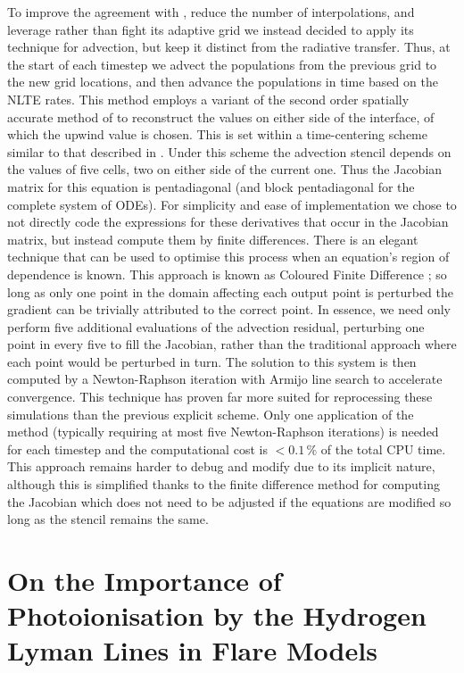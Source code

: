 To improve the agreement with \Radyn{}, reduce the number of interpolations, and leverage rather than fight its adaptive grid we instead decided to apply its technique for advection, but keep it distinct from the radiative transfer.
Thus, at the start of each timestep we advect the populations from the previous grid to the new grid locations, and then advance the populations in time based on the NLTE rates.
This method employs a variant of the second order spatially accurate method of \citet{VanLeer1979} to reconstruct the values on either side of the interface, of which the upwind value is chosen.
This is set within a time-centering scheme similar to that described in \citet{Dorfi1997}.
Under this scheme the advection stencil depends on the values of five cells, two on either side of the current one.
Thus the Jacobian matrix for this equation is pentadiagonal (and block pentadiagonal for the complete system of ODEs).
For simplicity and ease of implementation we chose to not directly code the expressions for these derivatives that occur in the Jacobian matrix, but instead compute them by finite differences.
There is an elegant technique that can be used to optimise this process when an equation's region of dependence is known.
This approach is known as Coloured Finite Difference \citep{Curtis1974}; so long as only one point in the domain affecting each output point is perturbed the gradient can be trivially attributed to the correct point.
In essence, we need only perform five additional evaluations of the advection residual, perturbing one point in every five to fill the Jacobian, rather than the traditional approach where each point would be perturbed in turn.
The solution to this system is then computed by a Newton-Raphson iteration with Armijo line search \NeedRef{} to accelerate convergence.
This technique has proven far more suited for reprocessing these simulations than the previous explicit scheme.
Only one application of the method (typically requiring at most five Newton-Raphson iterations) is needed for each timestep and the computational cost is $<0.1\,\%$ of the total CPU time.
This approach remains harder to debug and modify due to its implicit nature, although this is simplified thanks to the finite difference method for computing the Jacobian which does not need to be adjusted if the equations are modified so long as the stencil remains the same.

\section{On the Importance of \Caii{} Photoionisation by the Hydrogen Lyman Lines in Flare Models}\label{Sec:CaiiPhotoionisation}


